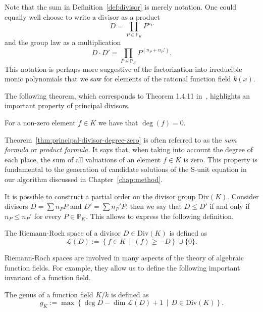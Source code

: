 Note that the sum in Definition~\ref{def:divisor} is merely notation. One could equally well choose to write a divisor as a product
\[D = \prod_{P \in \mathbb{P}_{K}} P^{n_{P}}\]
and the group law as a multiplication
\[D \cdot D' = \prod_{P \in \mathbb{P}_{K}} P^{\left(n_{P} + n_{P}'\right)}.\]
This notation is perhaps more suggestive of the factorization into irreducible monic polynomials that we saw for elements of the rational function field \(k(x)\).

The following theorem, which corresponds to Theorem 1.4.11 in~\cite{stichtenoth-2009-algebraic-function-fields}, highlights an important property of principal divisors.

\begin{theorem}%
  \label{thm:principal-divisor-degree-zero}
  For a non-zero element \(f \in K\) we have that \(\deg{(f)} = 0\).
\end{theorem}

Theorem~\ref{thm:principal-divisor-degree-zero} is often referred to as the \textit{sum formula} or \textit{product formula}. It says that, when taking into account the degree of each place, the sum of all valuations of an element \(f \in K\) is zero. This property is fundamental to the generation of candidate solutions of the S-unit equation in our algorithm discussed in Chapter~\ref{chap:method}.

It is possible to construct a partial order on the divisor group \(\mathrm{Div}(K)\). Consider divisors \({D = \sum n_{P}P}\) and \({D' = \sum n_{P}'P}\), then we say that \(D \leq D'\) if and only if \(n_{P} \leq n_{P}'\) for every \(P \in \mathbb{P}_{K}\). This allows to express the following definition.

\begin{definition}%
  \label{def:riemann-roch-space}
  The Riemann-Roch space of a divisor \(D \in \mathrm{Div}(K)\) is defined as
  \[\mathcal{L}(D) := \left\{ f \in K \,\middle|\, (f) \geq -D \right\} \cup \{0\}.\]
\end{definition}

Riemann-Roch spaces are involved in many aspects of the theory of algebraic function fields. For example, they allow us to define the following important invariant of a function field.

\begin{definition}%
  \label{def:genus}
  The genus of a function field \(K / k\) is defined as
  \[g_{K} := \max{\left\{ \deg{D} - \dim{\mathcal{L}(D)} + 1 \,\middle|\, D \in \mathrm{Div}(K) \right\}}.\]
\end{definition}

